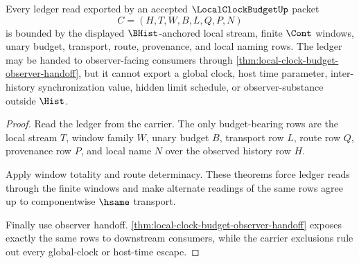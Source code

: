 \begin{theorem}
\label{thm:local-clock-budget-ledger-boundary}
Every ledger read exported by an accepted $\LocalClockBudgetUp$ packet
$$
C=(H,T,W,B,L,Q,P,N)
$$
is bounded by the displayed $\BHist$-anchored local stream, finite $\Cont$ windows, unary budget, transport, route, provenance, and local naming rows. The ledger may be handed to observer-facing consumers through \autoref{thm:local-clock-budget-observer-handoff}, but it cannot export a global clock, host time parameter, inter-history synchronization value, hidden limit schedule, or observer-substance outside $\Hist$.
\end{theorem}
\begin{proof}
Read the ledger from the carrier. The only budget-bearing rows are the local stream $T$, window family $W$, unary budget $B$, transport row $L$, route row $Q$, provenance row $P$, and local name $N$ over the observed history row $H$.

Apply window totality and route determinacy. These theorems force ledger reads through the finite windows and make alternate readings of the same rows agree up to componentwise $\hsame$ transport.

Finally use observer handoff. \autoref{thm:local-clock-budget-observer-handoff} exposes exactly the same rows to downstream consumers, while the carrier exclusions rule out every global-clock or host-time escape.
\end{proof}

